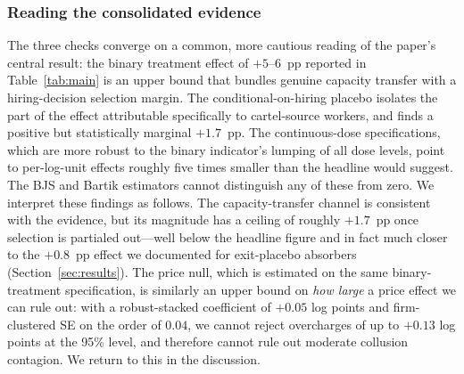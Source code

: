 \subsubsection*{Reading the consolidated evidence}

The three checks converge on a common, more cautious reading of the paper's central result: the binary treatment effect of $+5$--$6$~pp reported in Table~\ref{tab:main} is an upper bound that bundles genuine capacity transfer with a hiring-decision selection margin. The conditional-on-hiring placebo isolates the part of the effect attributable specifically to cartel-source workers, and finds a positive but statistically marginal $+1.7$~pp. The continuous-dose specifications, which are more robust to the binary indicator's lumping of all dose levels, point to per-log-unit effects roughly five times smaller than the headline would suggest. The BJS and Bartik estimators cannot distinguish any of these from zero. We interpret these findings as follows. The capacity-transfer channel is consistent with the evidence, but its magnitude has a ceiling of roughly $+1.7$~pp once selection is partialed out---well below the headline figure and in fact much closer to the $+0.8$~pp effect we documented for exit-placebo absorbers (Section~\ref{sec:results}). The price null, which is estimated on the same binary-treatment specification, is similarly an upper bound on \emph{how large} a price effect we can rule out: with a robust-stacked coefficient of $+0.05$ log points and firm-clustered SE on the order of $0.04$, we cannot reject overcharges of up to $+0.13$ log points at the 95\% level, and therefore cannot rule out moderate collusion contagion. We return to this in the discussion.

